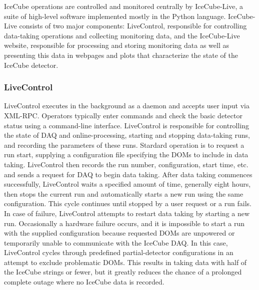 IceCube operations are controlled and monitored centrally by IceCube-Live, a suite of high-level software implemented mostly in the Python language.
IceCube-Live consists of two major components: LiveControl, responsible for controlling data-taking operations and
collecting monitoring data, and the IceCube-Live website, responsible for processing and storing monitoring data as well as presenting this data
in webpages and plots that characterize the state of the IceCube detector.

\subsubsection{LiveControl}

LiveControl executes in the background as a daemon and accepts user input via XML-RPC.
Operators typically enter commands and check the basic detector status using a command-line interface.  LiveControl is
responsible for controlling the state of DAQ and online-processing, starting and stopping data-taking runs, and recording
the parameters of these runs.  Stardard operation is to request a run start, supplying a configuration file specifying the DOMs to include in
data taking.  LiveControl then records the run number, configuration, start time, etc. and sends a request for DAQ to
begin data taking.  After data taking commences successfully, LiveControl waits a specified amount of time, generally eight
hours, then stops the current run and automatically starts a new run using the same configuration.  This cycle continues until
stopped by a user request or a run fails.  In case of failure, LiveControl attempts to restart data taking by starting a new
run.  Occasionally a hardware failure occurs, and it is impossible to start a run with the supplied configuration because requested DOMs are
unpowered or temporarily unable to communicate with the IceCube DAQ.  In this case, LiveControl cycles through predefined partial-detector
configurations in an attempt to exclude problematic DOMs.  This results in taking data with half of the IceCube strings or fewer, but it
greatly reduces the chance of a prolonged complete outage where no IceCube data is recorded.

